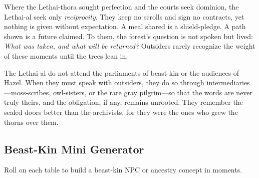 Where the Lethai-thora sought perfection and the courts seek dominion, the Lethai-al seek only \textit{reciprocity}. They keep no scrolls and sign no contracts, yet nothing is given without expectation. A meal shared is a shield-pledge. A path shown is a future claimed. To them, the forest's question is not spoken but lived: \textit{What was taken, and what will be returned?} Outsiders rarely recognize the weight of these moments until the trees lean in.

The Lethai-al do not attend the parliaments of beast-kin or the audiences of Hazel. When they must speak with outsiders, they do so through intermediaries---moss-scribes, owl-sisters, or the rare gray pilgrim---so that the words are never truly theirs, and the obligation, if any, remains unrooted. They remember the sealed doors better than the archivists, for they were the ones who grew the thorns over them.

\subsection*{Beast-Kin Mini Generator}
Roll on each table to build a beast-kin NPC or ancestry concept in moments.


